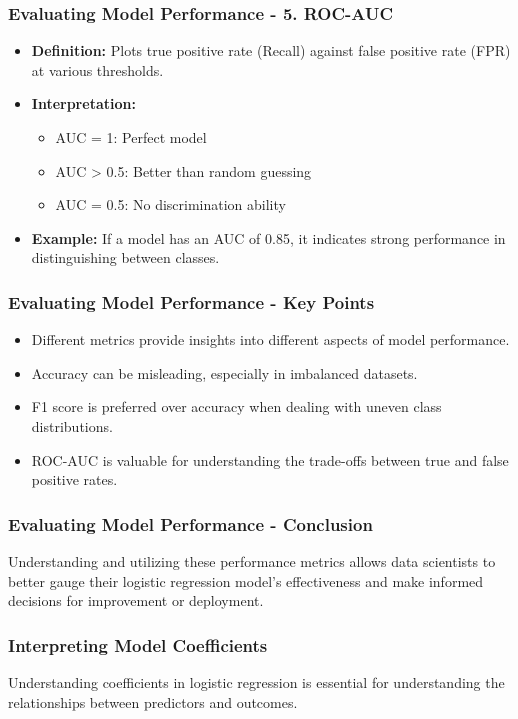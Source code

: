 \documentclass[aspectratio=169]{beamer}
\begin{document}
\begin{frame}[fragile]
    \frametitle{Evaluating Model Performance - 5. ROC-AUC}
    \begin{itemize}
        \item \textbf{Definition:} Plots true positive rate (Recall) against false positive rate (FPR) at various thresholds.
        \item \textbf{Interpretation:}
        \begin{itemize}
            \item AUC = 1: Perfect model
            \item AUC > 0.5: Better than random guessing
            \item AUC = 0.5: No discrimination ability
        \end{itemize}
        \item \textbf{Example:} If a model has an AUC of 0.85, it indicates strong performance in distinguishing between classes.
    \end{itemize}
\end{frame}

\begin{frame}[fragile]
    \frametitle{Evaluating Model Performance - Key Points}
    \begin{itemize}
        \item Different metrics provide insights into different aspects of model performance.
        \item Accuracy can be misleading, especially in imbalanced datasets.
        \item F1 score is preferred over accuracy when dealing with uneven class distributions.
        \item ROC-AUC is valuable for understanding the trade-offs between true and false positive rates.
    \end{itemize}
\end{frame}

\begin{frame}[fragile]
    \frametitle{Evaluating Model Performance - Conclusion}
    Understanding and utilizing these performance metrics allows data scientists to better gauge their logistic regression model's effectiveness and make informed decisions for improvement or deployment.
\end{frame}

\begin{frame}[fragile]
    \frametitle{Interpreting Model Coefficients}
    Understanding coefficients in logistic regression is essential for understanding the relationships between predictors and outcomes.
\end{frame}
\end{document}
